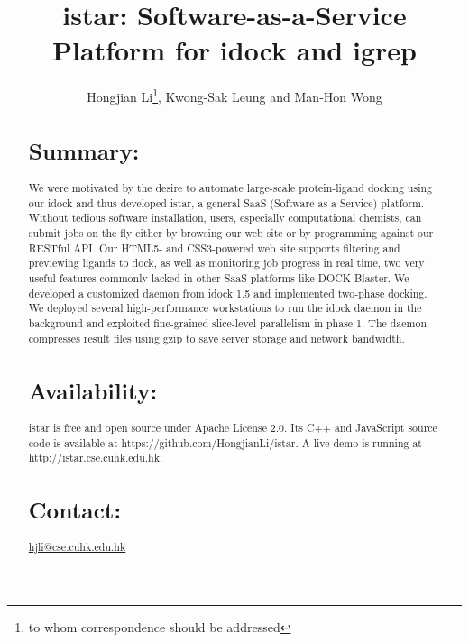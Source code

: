 \documentclass{bioinfo}
\begin{document}

\title[istar]{istar: Software-as-a-Service Platform for idock and igrep}
\author[Hongjian Li \textit{et~al}]{Hongjian Li\footnote{to whom correspondence should be addressed}, Kwong-Sak Leung and Man-Hon Wong}
\address{Department of Computer Science and Engineering, Chinese University of Hong Kong, Shatin, New Territories, Hong Kong, China}



\maketitle

\begin{abstract}
\section{Summary:}
We were motivated by the desire to automate large-scale protein-ligand docking using our idock and thus developed istar, a general SaaS (Software as a Service) platform. Without tedious software installation, users, especially computational chemists, can submit jobs on the fly either by browsing our web site or by programming against our RESTful API. Our HTML5- and CSS3-powered web site supports filtering and previewing ligands to dock, as well as monitoring job progress in real time, two very useful features commonly lacked in other SaaS platforms like DOCK Blaster. We developed a customized daemon from idock 1.5 and implemented two-phase docking. We deployed several high-performance workstations to run the idock daemon in the background and exploited fine-grained slice-level parallelism in phase 1. The daemon compresses result files using gzip to save server storage and network bandwidth.

\section{Availability:}
istar is free and open source under Apache License 2.0. Its C++ and JavaScript source code is available at https://github.com/HongjianLi/istar. A live demo is running at http://istar.cse.cuhk.edu.hk.

\section{Contact:} \href{hjli@cse.cuhk.edu.hk}{hjli@cse.cuhk.edu.hk}
\end{abstract}
\end{document}
